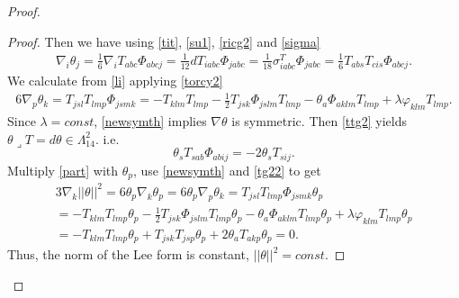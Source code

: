 \documentclass[10pt,british]{article}
\def\sb {{\nabla}}
\def\p{{\varphi}}
\def\ph{{\Phi}}
\begin{document}
\begin{proof}
\begin{proof}
Then we have using \eqref{tit}, \eqref{su1}, \eqref{ricg2} and \eqref{sigma}
\begin{equation}\label{li}
\begin{split}
\sb_i\theta_j=\frac16\sb_iT_{abc}\ph_{abcj}=\frac1{12}dT_{iabc}\ph_{jabc}=\frac1{18}\sigma^T_{iabc}\ph_{jabc}=
\frac16T_{abs}T_{cis}\ph_{abcj}.
\end{split}
\end{equation}
We calculate from \eqref{li} applying \eqref{torcy2}
\begin{equation}\label{part}
\begin{split}
6\sb_p\theta_k=T_{jsl}T_{lmp}\ph_{jsmk}
=-T_{klm}T_{lmp}-\frac12T_{jsk}\ph_{jslm}T_{lmp}-\theta_a\ph_{aklm}T_{lmp}+\lambda\p_{klm}T_{lmp}.
\end{split}
\end{equation}
Since $\lambda=const$, \eqref{newsymth} implies $\sb\theta$ is symmetric. Then \eqref{ttg2} yields $\theta\lrcorner T=d\theta\in \Lambda^2_{14}$. i.e. 
\begin{equation}\label{tg22}
\theta_sT_{sab}\ph_{abij}=-2\theta_sT_{sij}.
\end{equation}
Multiply \eqref{part} with $\theta_p$, use \eqref{newsymth} and \eqref{tg22} to get
\begin{equation}\label{part1}
\begin{split}
3\sb_k||\theta||^2=6\theta_p\sb_k\theta_p=6\theta_p\sb_p\theta_k=T_{jsl}T_{lmp}\ph_{jsmk}\theta_p\\
=-T_{klm}T_{lmp}\theta_p-\frac12T_{jsk}\ph_{jslm}T_{lmp}\theta_p-\theta_a\ph_{aklm}T_{lmp}\theta_p+\lambda\p_{klm}T_{lmp}\theta_p\\
=-T_{klm}T_{lmp}\theta_p+T_{jsk}T_{jsp}\theta_p+2\theta_aT_{akp}\theta_p=0.
\end{split}
\end{equation}
Thus, the norm of the Lee form is constant, $||\theta||^2=const$.


\end{proof}
\end{proof}
\end{document}
